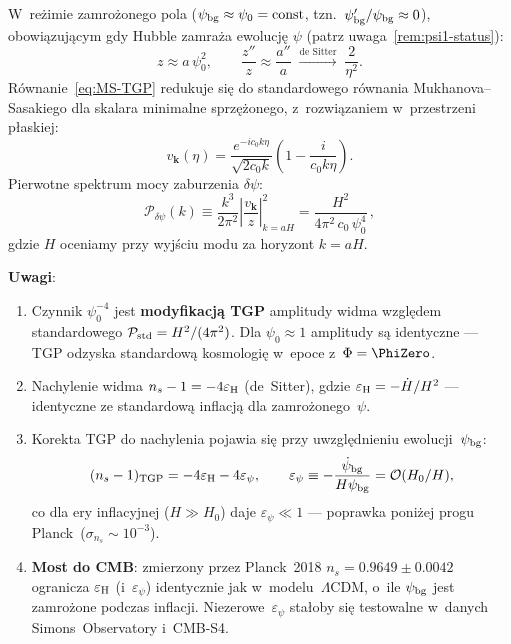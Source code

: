 \begin{corollary}\label{cor:TGP-power-spectrum}
W~re\.zimie zamro\.zonego pola
($\psi_{\rm bg} \approx \psi_0 = \mathrm{const}$,
tzn.~$\psi_{\rm bg}'/\psi_{\rm bg} \approx 0$),
obowi\k{a}zuj\k{a}cym gdy Hubble zamra\.za ewolucj\k{e} $\psi$
(patrz uwaga~\ref{rem:psi1-status}):
\begin{equation}\label{eq:MS-TGP-frozen}
  z \approx a\,\psi_0^2,
  \qquad
  \frac{z''}{z} \approx \frac{a''}{a}
  \;\xrightarrow{\text{de~Sitter}}\;
  \frac{2}{\eta^2}.
\end{equation}
R\'ownanie~\eqref{eq:MS-TGP} redukuje si\k{e} do standardowego
r\'ownania Mukhanova--Sasakiego dla skalara minimalne sprzężonego,
z~rozwi\k{a}zaniem w~przestrzeni p\l{}askiej:
\[
  v_{\mathbf{k}}(\eta)
  = \frac{e^{-ic_0 k\eta}}{\sqrt{2c_0 k}}
    \!\left(1 - \frac{i}{c_0 k\eta}\right).
\]
Pierwotne spektrum mocy zaburzenia $\delta\psi$:
\begin{equation}\label{eq:TGP-power-spectrum}
  \boxed{
    \mathcal{P}_{\delta\psi}(k)
    \equiv \frac{k^3}{2\pi^2}\left|\frac{v_{\mathbf{k}}}{z}\right|^2_{\!\!\!k=aH}
    = \frac{H^2}{4\pi^2\,c_0\,\psi_0^4}\,,
  }
\end{equation}
gdzie $H$ oceniamy przy wyj\'sciu modu za horyzont $k = aH$.

\medskip
\noindent\textbf{Uwagi}:
\begin{enumerate}[nosep]
  \item Czynnik $\psi_0^{-4}$ jest \textbf{modyfikacj\k{a} TGP}
    amplitudy widma wzgl\k{e}dem standardowego
    $\mathcal{P}_{\rm std} = H^2/(4\pi^2)$.
    Dla $\psi_0 \approx 1$ amplitudy s\k{a} identyczne --- TGP
    odzyska standardow\k{a} kosmologi\k{e} w~epoce z~$\Phi = \PhiZero$.
  \item Nachylenie widma $n_s - 1 = -4\varepsilon_{\rm H}$
    (de~Sitter), gdzie $\varepsilon_{\rm H} = -\dot H/H^2$ ---
    identyczne ze standardow\k{a} inflacj\k{a} dla zamro\.zonego~$\psi$.
  \item Korekta TGP do nachylenia pojawia si\k{e} przy
    uwzgl\k{e}dnieniu ewolucji~$\psi_{\rm bg}$:
    \begin{equation}\label{eq:ns-TGP}
      (n_s - 1)_{\rm TGP}
      = -4\varepsilon_{\rm H} - 4\varepsilon_\psi,
      \qquad
      \varepsilon_\psi
      \equiv -\frac{\dot\psi_{\rm bg}}{H\psi_{\rm bg}}
      = \mathcal{O}(H_0/H),
    \end{equation}
    co dla ery inflacyjnej ($H \gg H_0$) daje $\varepsilon_\psi \ll 1$
    --- poprawka poni\.zej progu Planck~($\sigma_{n_s} \sim 10^{-3}$).
  \item \textbf{Most do CMB}: zmierzony przez Planck~2018
    $n_s = 0.9649 \pm 0.0042$ ogranicza $\varepsilon_{\rm H}$
    (i~$\varepsilon_\psi$) identycznie jak w~modelu~$\Lambda$CDM,
    o~ile $\psi_{\rm bg}$ jest zamro\.zone podczas inflacji.
    Niezerowe~$\varepsilon_\psi$ sta\l{}oby si\k{e} testowalne
    w~danych Simons~Observatory i~CMB-S4.
\end{enumerate}
\end{corollary}

